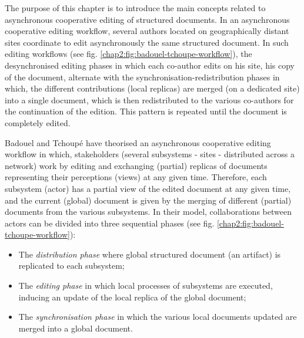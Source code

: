 \label{chap2:sec:introduction}
The purpose of this chapter is to introduce the main concepts related to asynchronous cooperative editing of structured documents. In an asynchronous cooperative editing workflow, several authors located on geographically distant sites coordinate to edit asynchronously the same structured document. In such editing workflows (see fig. \ref{chap2:fig:badouel-tchoupe-workflow}), the desynchronised editing phases in which each co-author edits on his site, his copy of the document, alternate with the synchronisation-redistribution phases in which, the different contributions (local replicas) are merged (on a dedicated site) into a single document, which is then redistributed to the various co-authors for the continuation of the edition. This pattern is repeated until the document is completely edited.

Badouel and Tchoup\'e \citeyearpar{badouelTchoupeCmcs} have theorised an asynchronous cooperative editing workflow in which, stakeholders (several subsystems - sites - distributed across a network) work by editing and exchanging (partial) replicas of documents representing their perceptions (views) at any given time. Therefore, each subsystem (actor) has a partial view of the edited document at any given time, and the current (global) document is given by the merging of different (partial) documents from the various subsystems. In their model, collaborations between actors can be divided into three sequential phases (see fig. \ref{chap2:fig:badouel-tchoupe-workflow}): 
\begin{itemize}
	\item The \textit{distribution phase} where global structured document (an artifact) is replicated to each subsystem;
	\item The \textit{editing phase} in which local processes of subsystems are executed, inducing an update of the local replica of the global document; 
	\item The \textit{synchronisation phase} in which the various local documents updated are merged into a global document.
\end{itemize}

